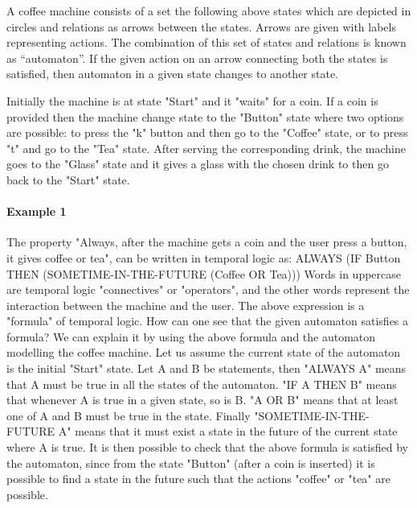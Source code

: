 \documentclass{article}
\begin{document}



A coffee machine consists of a set the following above states which are depicted in circles and relations as arrows between the states. Arrows are given with labels representing actions. The combination of this set of states and relations is known as “automaton”.  If the given action on an arrow connecting both the states is satisfied, then automaton in a given state changes to another state.

Initially the machine is at state "Start" and it "waits" for a coin. If a coin is provided then the machine change state to the "Button" state where two options are possible: to press the "k" button and then go to the "Coffee" state, or to press "t" and go to the "Tea" state. After serving the corresponding drink, the machine goes to the "Glass" state and it gives a glass with the chosen drink to then go back to the "Start" state.


\paragraph{Example 1}

The property "Always, after the machine gets a coin and the user press a button, it gives coffee or tea", can be written in temporal logic as:
ALWAYS (IF Button THEN (SOMETIME-IN-THE-FUTURE (Coffee OR Tea)))
Words in uppercase are temporal logic "connectives" or "operators", and the other words represent the interaction between the machine and the user. The above expression is a "formula" of temporal logic.
How can one see that the given automaton satisfies a formula? We can explain it by using the above formula and the automaton modelling the coffee machine.
Let us assume the current state of the automaton is the initial "Start" state. Let A and B be statements, then "ALWAYS A" means that A must be true in all the states of the automaton. "IF A THEN B" means that whenever A is true in a given state, so is B. "A OR B" means that at least one of A and B must be true in the state. Finally "SOMETIME-IN-THE-FUTURE A" means that it must exist a state in the future of the current state where A is true.
It is then possible to check that the above formula is satisfied by the automaton, since from the state "Button" (after a coin is inserted) it is possible to find a state in the future such that the actions "coffee" or "tea" are possible.
\end{document}
